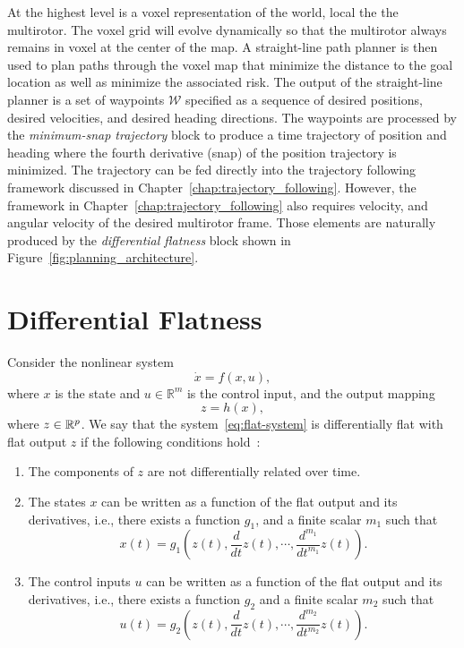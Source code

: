 At the highest level is a voxel representation of the world, local the the multirotor.  The voxel grid will evolve dynamically so that the multirotor always remains in voxel at the center of the map.  A straight-line path planner is then used to plan paths through the voxel map that minimize the distance to the goal location as well as minimize the associated risk.  The output of the straight-line planner is a set of waypoints $\mathcal{W}$ specified as a sequence of desired positions, desired velocities, and desired heading directions.  The waypoints are processed by the {\em minimum-snap trajectory} block to produce a time trajectory of position and heading where the fourth derivative (snap) of the position trajectory is minimized.  The trajectory can be fed directly into the trajectory following framework discussed in Chapter~\ref{chap:trajectory_following}.  However, the framework in Chapter~\ref{chap:trajectory_following} also requires velocity, and angular velocity of the desired multirotor frame.  Those elements are naturally produced by the {\em differential flatness} block shown in Figure~\ref{fig:planning_architecture}.


\section{Differential Flatness}
\label{sec:differential_flatness}

Consider the nonlinear system
\begin{equation}\label{eq:flat-system}
\dot{x} = f(x,u),
\end{equation}
where $x$ is the state and $u\in\mathbb{R}^m$ is the control input, and the output mapping
\begin{equation}\label{eq:flat-output}
z = h(x),
\end{equation}
where $z\in{\mathbb{R}}^p$.  We say that the system~\eqref{eq:flat-system} is differentially flat with flat output $z$ if the following conditions hold~\cite{CowlingYakimenkoWhidborne07}:
\begin{enumerate}
\item The components of $z$ are not differentially related over time.
\item The states $x$ can be written as a function of the flat output and its derivatives, i.e., there exists a function $g_1$, and a finite scalar $m_1$ such that
    \begin{equation}\label{eq:flat-g1}
    x(t) = g_1\left(z(t),\frac{d}{dt}z(t),\cdots,\frac{d^{m_1}}{dt^{m_1}}z(t)\right).
    \end{equation}
\item The control inputs $u$ can be written as a function of the flat output and its derivatives, i.e., there exists a function $g_2$ and a finite scalar $m_2$ such that
    \begin{equation}\label{eq:flat-g2}
    u(t) = g_2\left(z(t),\frac{d}{dt}z(t),\cdots,\frac{d^{m_2}}{dt^{m_2}}z(t)\right).
    \end{equation}
\end{enumerate}

